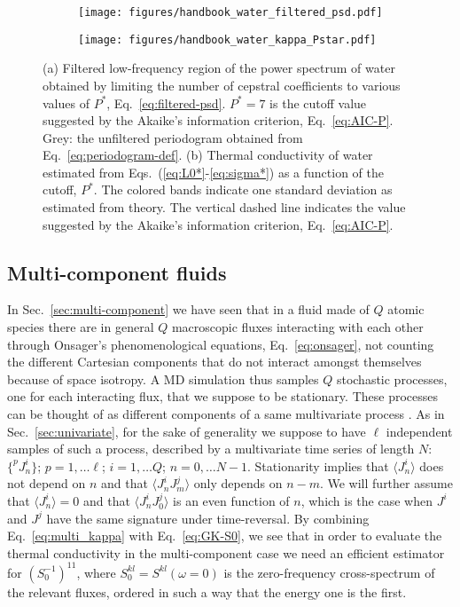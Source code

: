 \begin{figure}
    \centering
    \begin{subfigure}[tb]{1\textwidth}
    	\centering
        \texttt{[image: figures/handbook\_water\_filtered\_psd.pdf]}
        \caption{}
        \label{fig:water-filtered-psd}
    \end{subfigure}

    \begin{subfigure}[tb]{1\textwidth}
    	\centering
        \texttt{[image: figures/handbook\_water\_kappa\_Pstar.pdf]}
        \caption{}
        \label{fig:water-fkappa-Pstar}
    \end{subfigure}
    \caption{
    (a) Filtered low-frequency region of the power spectrum of water obtained by limiting the number of cepstral coefficients to various values of $P^*$, Eq.~\eqref{eq:filtered-psd}. $P^*=7$ is the cutoff value suggested by the Akaike's information criterion, Eq.~\eqref{eq:AIC-P}. Grey: the unfiltered periodogram obtained from Eq.~\eqref{eq:periodogram-def}.
    (b) Thermal conductivity of water estimated from Eqs.~(\ref{eq:L0*}-\ref{eq:sigma*}) as a function of the cutoff, $P^*$. The colored bands indicate one standard deviation as estimated from theory. The vertical dashed line indicates the value suggested by the Akaike's information criterion, Eq.~\eqref{eq:AIC-P}.
    }
\end{figure}


\subsection{Multi-component fluids}
In Sec.~\ref{sec:multi-component} we have seen that in a fluid made of $Q$ atomic species there are in general $Q$ macroscopic fluxes interacting with each other through Onsager's phenomenological equations, Eq.~\eqref{eq:onsager}, not counting the different Cartesian components that do not interact amongst themselves because of space isotropy. A MD simulation thus samples $Q$ stochastic processes, one for each interacting flux, that we suppose to be stationary. These processes can be thought of as different components of a same multivariate process \citep{Bertossa2018}. As in Sec.~\ref{sec:univariate}, for the sake of generality we suppose to have $\ell$ independent samples of such a process, described by a multivariate time series of length $N$: $\{ ^{p\!}{J}^i_n \}$; $p=1,\dots \ell$; $i=1,\dots Q$; $n=0,\dots N-1$. Stationarity implies that $\langle {J}^i_n\rangle $ does not depend on $n$ and that $\langle {J}^i_n {J}^j_m \rangle$ only depends on $n-m$. We will further assume that $\langle {J}^i_n\rangle =0 $ and that $\langle {J}^i_n {J}^j_0 \rangle$ is an even function of $n$, which is the case when ${J}^i$ and ${J}^j$ have the same signature under time-reversal. By combining Eq.~\eqref{eq:multi_kappa} with Eq.~\eqref{eq:GK-S0}, we see that in order to evaluate the thermal conductivity in the multi-component case we need an efficient estimator for $\left ( S^{-1}_0\right )^{11}$, where $S^{kl}_0=S^{kl}(\omega=0)$ is the zero-frequency cross-spectrum of the relevant fluxes, ordered in  such a way that the energy one is the first.

